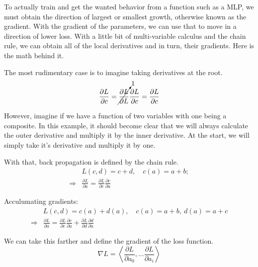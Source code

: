 To actually train and get the wanted behavior from a function such as a MLP, 
we must obtain the direction of largest or smallest growth, 
otherwise known as the gradient. With the gradient of the parameters,
we can use that to move in a direction of lower loss. With a little bit
of multi-variable calculus and the chain rule, we can obtain all of the local derivatives
and in turn, their gradients. Here is the math behind it.

The most rudimentary case is to imagine taking derivatives at the root.
\begin{equation}
    \frac{\partial L}{\partial c} = \cancelto{1}{\frac{\partial L }{\partial L }} \frac{\partial L}{\partial c} = \frac{\partial L}{\partial c}
\end{equation}

However, imagine if we have a function of two variables with one being a composite.
In this example, it should become clear that we will always calculate the outer derivative and multiply it by the inner derivative.
At the start, we will simply take it's derivative and multiply it by one. 

\begin{definition}
    With that, back propagation is defined by the chain rule.
    \begin{align}
        & L(c, d) = c + d, \quad  c(a) = a+b; \\
        \Longrightarrow  & \boxed{\frac{\partial L}{\partial a} = \frac{\partial L }{\partial c } \frac{\partial c}{\partial a}}
    \end{align}

    Acculumating gradients:
    \begin{align}
        & L(c, d) = c(a) + d(a), \quad c(a) = a + b, \ d(a) = a + c\\
       \Longrightarrow & \boxed{\frac{\partial L}{\partial a} =\frac{\partial L}{\partial c}\frac{\partial c}{\partial a}+\frac{\partial L}{\partial d}\frac{\partial d}{\partial a}}
    \end{align}
\end{definition}

\begin{definition}[Gradient]
    We can take this farther and define the gradient of the loss function.
        \begin{equation}
        \boxed{\nabla L = \left\langle \frac{\partial L}{\partial a_0}, \dots \frac{\partial L}{\partial a_i} \right\rangle}
    \end{equation}
\end{definition}

